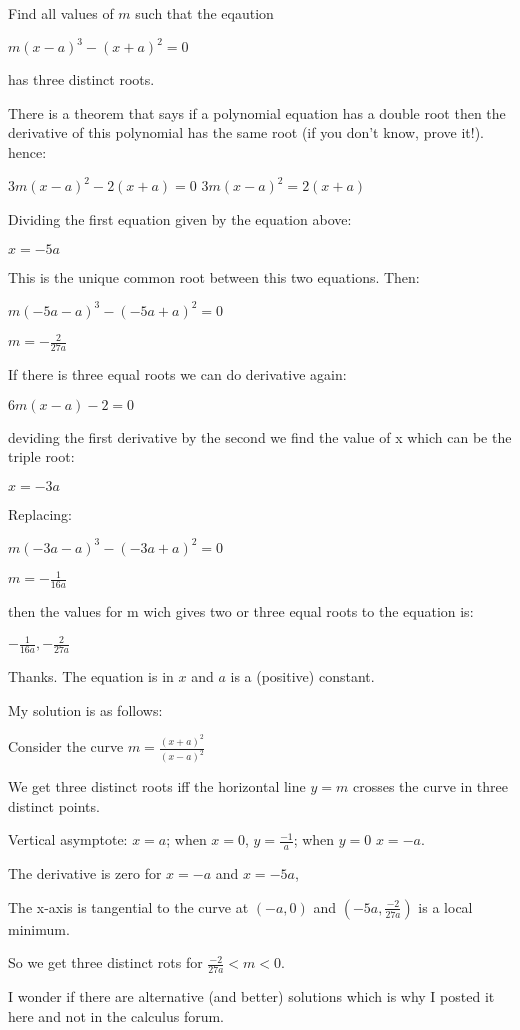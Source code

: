 \begin{solution}
	\begin{tcolorbox}Find all values of $m$ such that the eqaution

$m(x-a)^{3} -(x+a)^{2} =0$

has three distinct roots.\end{tcolorbox}

There is a theorem that says if a polynomial equation has a double root then the derivative of this polynomial has the same root (if you don't know, prove it!). hence:

$ 3m{(x-a)}^2 - 2{(x+a)} = 0 $
$ 3m{(x-a)}^2 = 2{(x+a)} $

Dividing the first equation given by the equation above:

$ x=-5a $

This is the unique common root between this two equations. Then:

$m(-5a-a)^{3} -(-5a+a)^{2} =0$

$ m=-\frac{2}{27a} $

If there is three equal roots we can do derivative again:

$ 6m{(x-a)} - 2 = 0 $

deviding the first derivative by the second we find the value of x which can be the triple root:

$ x=-3a $

Replacing:

$m(-3a-a)^{3} -(-3a+a)^{2} =0$

$m=-\frac{1}{16a} $

then the values for m wich gives two or three equal roots to the equation is:

$ -\frac{1}{16a} , -\frac{2}{27a} $
\end{solution}



\begin{solution}
	Thanks. The equation is in $x$ and $a$ is a (positive) constant.

My solution is as follows:

Consider the curve $m= \frac{(x+a)^{2}}{(x-a)^{2}}$

We get three distinct roots iff the horizontal line $y=m$ crosses the curve in three distinct points.

Vertical asymptote: $x=a$; when $x=0$,  $y= \frac{-1}{a}$; when $y=0$  $x=-a$.

The derivative is zero for $x=-a$ and $x=-5a$,

The x-axis is tangential to the curve at $(-a, 0)$ and $(-5a, \frac{-2}{27a})$ is a local minimum.

So we get three distinct rots for $\frac{-2}{27a} < m < 0$.

I wonder if there are alternative (and better) solutions which is why I posted it here and not in the calculus forum.
\end{solution}



